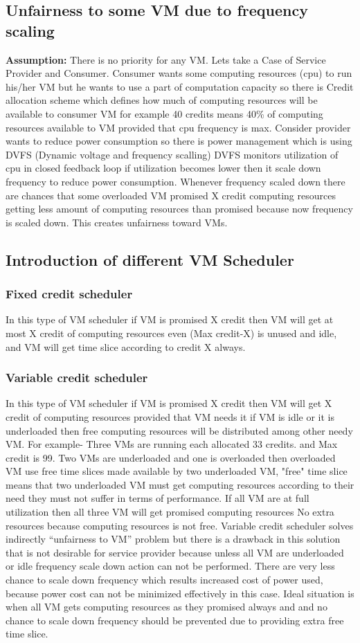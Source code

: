 \documentclass[seminar,twoside]{iitbreport}
\begin{document}
\subsection{Unfairness to some VM due to frequency scaling}
{\bf Assumption:} There is no priority for any VM.
Lets take a Case of Service Provider and Consumer.
Consumer wants some computing resources (cpu) to run his/her VM but he wants to use a part of computation capacity so
there is Credit allocation scheme which defines how much of computing resources will be available to consumer VM for example 
40 credits means 40\% of computing resources available to VM provided that cpu frequency is max.
Consider provider wants to reduce power consumption so there is power management which is using DVFS (Dynamic voltage and frequency scalling)
DVFS monitors utilization of cpu in closed feedback loop if utilization becomes lower then it scale down frequency to reduce power 
consumption. Whenever frequency scaled down there are chances that some overloaded VM promised X credit computing resources getting 
less amount of computing resources than promised because now frequency is scaled down. This creates unfairness toward VMs.
\subsection{Introduction of different VM Scheduler}
\subsubsection{ Fixed credit scheduler}
In this type of VM scheduler if VM is promised X credit then VM will get at most X credit of computing resources even (Max credit-X) is unused and
idle, and VM will get time slice according to credit X always.
\subsubsection{ Variable credit scheduler}
In this type of VM scheduler if VM is promised X credit then VM will get X credit of computing resources provided that VM needs it
if VM is idle or it is underloaded then free computing resources will be distributed among other needy VM.
For example- Three VMs are running each allocated 33 credits. and Max credit is 99.
Two VMs are underloaded and one is overloaded then overloaded VM use free time slices made available by two underloaded VM, "free" time slice
means that two underloaded VM must get computing resources according to their need they must not suffer in terms of performance.
If all VM are at full utilization then all three VM will get promised computing resources No extra resources because computing resources is not free. 
Variable credit scheduler solves indirectly ``unfairness to VM'' problem but there is a drawback in this solution 
that is not desirable for service provider because unless all VM are underloaded or idle frequency scale down action can not be performed. 
There are very less chance to scale down frequency which results increased cost of power used, 
because power cost can not be minimized effectively in this case.
Ideal situation is when all VM gets computing resources as they promised always and 
and no chance to scale down frequency should be prevented due to providing extra free time slice. 
\end{document}
